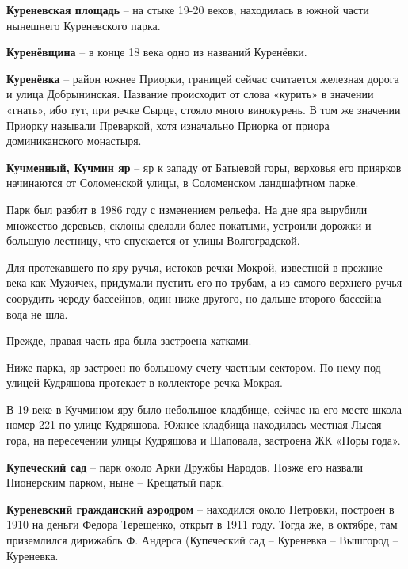 \medskip

\textbf{Куреневская площадь} – на стыке 19-20 веков, находилась в южной части нынешнего Куреневского парка.\\

\medskip

\textbf{Куренёвщина} – в конце 18 века одно из названий Куренёвки.\\

\medskip

\textbf{Куренёвка} – район южнее Приорки, границей сейчас считается железная дорога и улица Добрынинская. Название происходит от слова «курить» в значении «гнать», ибо тут, при речке Сырце, стояло много винокурень. В том же значении Приорку называли Преваркой, хотя изначально Приорка от приора доминиканского монастыря.\\

\medskip

\textbf{Кучменный, Кучмин яр} – яр к западу от Батыевой горы, верховья его приярков начинаются от Соломенской улицы, в Соломенском ландшафтном парке.

Парк был разбит в 1986 году с изменением рельефа. На дне яра вырубили множество деревьев, склоны сделали более покатыми, устроили дорожки и большую лестницу, что спускается от улицы Волгоградской. 

Для протекавшего по яру ручья, истоков речки Мокрой, известной в прежние века как Мужичек, придумали пустить его по трубам, а из самого верхнего ручья соорудить череду бассейнов, один ниже другого, но дальше второго бассейна вода не шла.

Прежде, правая часть яра была застроена хатками.

Ниже парка, яр застроен по большому счету частным сектором. По нему под улицей Кудряшова протекает в коллекторе речка Мокрая. 

В 19 веке в Кучмином яру было небольшое кладбище, сейчас на его месте школа номер 221 по улице Кудряшова. Южнее кладбища находилась местная Лысая гора, на пересечении улицы Кудряшова и Шаповала, застроена ЖК «Поры года».\\

\medskip

\textbf{Купеческий сад} – парк около Арки Дружбы Народов. Позже его назвали Пионерским парком, ныне – Крещатый парк.\\

\medskip

\textbf{Куреневский гражданский аэродром} – находился около Петровки, построен в 1910 на деньги Федора Терещенко, открыт в 1911 году. Тогда же, в октябре, там приземлился дирижабль Ф. Андерса (Купеческий сад – Куреневка – Вышгород – Куреневка.\\ 

